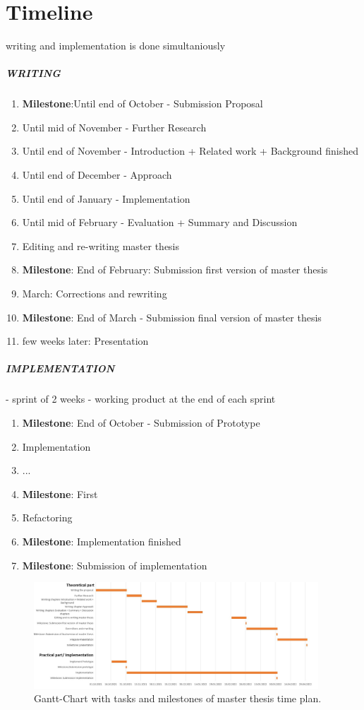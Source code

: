 \chapter{Timeline}
\label{ch:timeline}

writing and implementation is done simultaniously

\paragraph{WRITING}
\begin{enumerate}
    \item \textbf{Milestone}:Until end of October - Submission Proposal 
    \item Until mid of November -  Further Research
    \item Until end of November - Introduction + Related work + Background finished
    \item Until end of December -  Approach
    \item Until end of January - Implementation
    \item Until mid of February - Evaluation + Summary and Discussion
    \item Editing and re-writing master thesis
    \item \textbf{Milestone}: End of February: Submission first version of master thesis
    \item March: Corrections and rewriting
    \item \textbf{Milestone}: End of March - Submission final version of master thesis
    \item few weeks later: Presentation
\end{enumerate}

\paragraph{IMPLEMENTATION} - sprint of 2 weeks - working product at the end of each sprint
\begin{enumerate}
    \item \textbf{Milestone}: End of October - Submission of Prototype
    \item Implementation
    \item ...
    \item \textbf{Milestone}: First
    \item Refactoring
    \item \textbf{Milestone}: Implementation finished
    \item \textbf{Milestone}: Submission of implementation
\end{enumerate}
    
\begin{figure}[t]
  \centering
    \includegraphics[width=0.95\textwidth]{figures/gantt_chart.png}
  \caption{Gantt-Chart with tasks and milestones of master thesis time plan.}
  \label{fig:overview}
\end{figure}